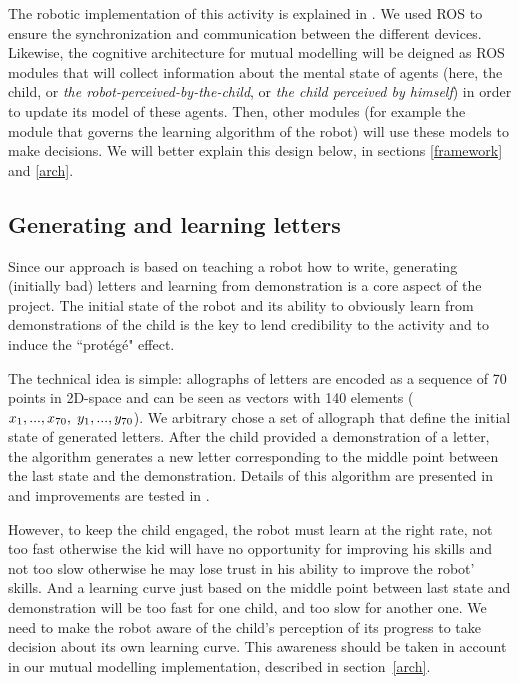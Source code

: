 \documentclass[10pt,a4paper]{article}
\begin{document}
The robotic implementation of this activity is explained in \cite{Hood}. We used ROS to ensure the synchronization and communication between the different devices. Likewise, the cognitive architecture for mutual modelling will be deigned as ROS modules that will collect information about the mental state of agents (here, the child, or \textit{the robot-perceived-by-the-child}, or \textit{the child perceived by himself}) in order to update its model of these agents. Then, other modules (for example the module that governs the learning algorithm of the robot) will use these models to make decisions. We will better explain this design below, in sections \ref{framework} and \ref{arch}.

\subsection{Generating and learning letters}

Since our approach is based on teaching a robot how to write, generating (initially
bad) letters and learning from demonstration is a core aspect of the project.
The initial state of the robot and its ability to obviously learn from demonstrations of the child is the key to lend credibility to the activity and to induce the ``prot\'eg\'e" effect.

The technical idea is simple: allographs of letters are encoded as a sequence of 70 points in
2D-space and can be seen as vectors with 140 elements
($x_1,...,x_{70},\hspace{1mm}y_1,...,y_{70}$). We arbitrary chose a set of allograph
that define the initial state of generated letters. 
After the child provided a demonstration of a letter, the algorithm
generates a new letter corresponding to the middle point between the last state and the
demonstration. Details of this algorithm are presented in \cite{Hood} and improvements are tested in \cite{jacq2016building}.

However, to keep the child engaged, the robot must learn at the right rate, not too fast otherwise the kid will have
no opportunity for improving his skills and not too slow otherwise he may lose
trust in his ability to improve the robot' skills. And a learning curve just based on the middle point between last state and demonstration will be too fast for one child, and too slow for another one. 
We need to make the robot aware of the child's perception of its progress to take decision about its own learning curve. This awareness should be taken in account in our mutual modelling implementation, described in section~\ref{arch}. 
\end{document}
